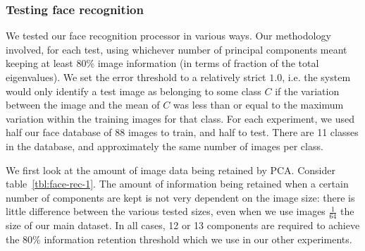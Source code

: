 \subsubsection{Testing face recognition}
\label{sec:pcaresults}

We tested our face recognition processor in various ways. Our methodology involved, for each test, using whichever number of principal components meant keeping at least 80\% image information (in terms of fraction of the total eigenvalues). We set the error threshold to a relatively strict $1.0$, i.e. the system would only identify a test image as belonging to some class $C$ if the variation between the image and the mean of $C$ was less than or equal to the maximum variation within the training images for that class. For each experiment, we used half our face database of 88 images to train, and half to test. There are 11 classes in the database, and approximately the same number of images per class.

We first look at the amount of image data being retained by PCA. Consider table~\ref{tbl:face-rec-1}. The amount of information being retained when a certain number of components are kept is not very dependent on the image size: there is little difference between the various tested sizes, even when we use images $\frac{1}{64}$ the size of our main dataset. In all cases, 12 or 13 components are required to achieve the 80\% information retention threshold which we use in our other experiments.

